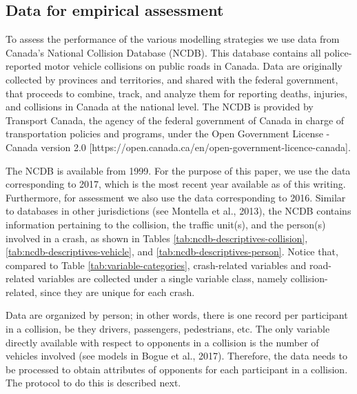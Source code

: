 \documentclass[]{elsarticle} %
\begin{document}
\hypertarget{sec:data}{%
\subsection{Data for empirical assessment}\label{sec:data}}

To assess the performance of the various modelling strategies we use
data from Canada's National Collision Database (NCDB). This database
contains all police-reported motor vehicle collisions on public roads in
Canada. Data are originally collected by provinces and territories, and
shared with the federal government, that proceeds to combine, track, and
analyze them for reporting deaths, injuries, and collisions in Canada at
the national level. The NCDB is provided by Transport Canada, the agency
of the federal government of Canada in charge of transportation policies
and programs, under the Open Government License - Canada version 2.0
{[}https://open.canada.ca/en/open-government-licence-canada{]}.

The NCDB is available from 1999. For the purpose of this paper, we use
the data corresponding to 2017, which is the most recent year available
as of this writing. Furthermore, for assessment we also use the data
corresponding to 2016. Similar to databases in other jurisdictions (see
Montella et al., 2013), the NCDB contains information pertaining to the
collision, the traffic unit(s), and the person(s) involved in a crash,
as shown in Tables \ref{tab:ncdb-descriptives-collision},
\ref{tab:ncdb-descriptives-vehicle}, and
\ref{tab:ncdb-descriptives-person}. Notice that, compared to Table
\ref{tab:variable-categories}, crash-related variables and road-related
variables are collected under a single variable class, namely
collision-related, since they are unique for each crash.

Data are organized by person; in other words, there is one record per
participant in a collision, be they drivers, passengers, pedestrians,
etc. The only variable directly available with respect to opponents in a
collision is the number of vehicles involved (see models in Bogue et
al., 2017). Therefore, the data needs to be processed to obtain
attributes of opponents for each participant in a collision. The
protocol to do this is described next.

\begingroup\fontsize{7}{9}\selectfont
\end{document}
